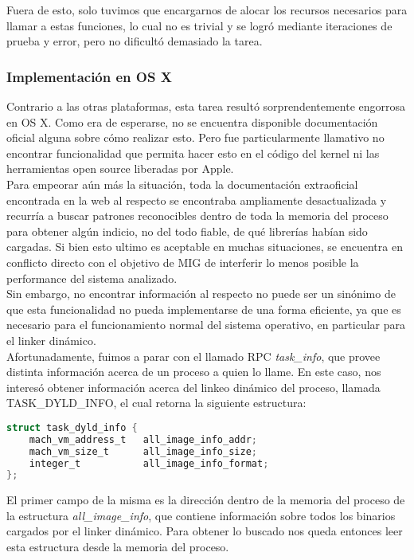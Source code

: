 Fuera de esto, solo tuvimos que encargarnos de alocar los recursos necesarios
para llamar a estas funciones, lo cual no es trivial y se logró mediante
iteraciones de prueba y error, pero no dificultó demasiado la tarea.\\

\subsubsection{Implementación en OS X}

Contrario a las otras plataformas, esta tarea resultó sorprendentemente
engorrosa en OS X. Como era de esperarse, no se encuentra disponible
documentación oficial alguna sobre cómo realizar esto. Pero fue particularmente
llamativo no encontrar funcionalidad que permita hacer esto en el código del
kernel ni las herramientas open source liberadas por Apple.\\

Para empeorar aún más la situación, toda la documentación extraoficial
encontrada en la web al respecto se encontraba ampliamente desactualizada y
recurría a buscar patrones reconocibles dentro de toda la memoria del proceso
para obtener algún indicio, no del todo fiable, de qué librerías habían sido
cargadas. Si bien esto ultimo es aceptable en muchas situaciones, se encuentra
en conflicto directo con el objetivo de MIG de interferir lo menos posible la
performance del sistema analizado.\\

Sin embargo, no encontrar información al respecto no puede ser un sinónimo de
que esta funcionalidad no pueda implementarse de una forma eficiente, ya que es
necesario para el funcionamiento normal del sistema operativo, en particular
para el linker dinámico.\\

Afortunadamente, fuimos a parar con el llamado RPC \textit{task\_info}, que
provee distinta información acerca de un proceso a quien lo llame. En este
caso, nos interesó obtener información acerca del linkeo dinámico del proceso,
llamada TASK\_DYLD\_INFO, el cual retorna la siguiente estructura:

\begin{lstlisting}[language=C]
struct task_dyld_info {
	mach_vm_address_t	all_image_info_addr;
	mach_vm_size_t		all_image_info_size;
    integer_t           all_image_info_format;
};
\end{lstlisting}

\noindent El primer campo de la misma es la dirección dentro de la memoria del
proceso de la estructura \textit{all\_image\_info}, que contiene información
sobre todos los binarios cargados por el linker dinámico. Para obtener lo
buscado nos queda entonces leer esta estructura desde la memoria del proceso.\\

